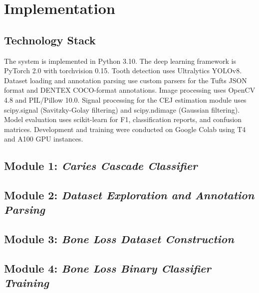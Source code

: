 
\chapter{Implementation}
\label{ch:implementation}

\section{Technology Stack}
\label{sec:impl-stack}

The system is implemented in Python 3.10. The deep learning framework is PyTorch 2.0 with torchvision 0.15. Tooth detection uses Ultralytics YOLOv8. Dataset loading and annotation parsing use custom parsers for the Tufts JSON format and DENTEX COCO-format annotations. Image processing uses OpenCV 4.8 and PIL/Pillow 10.0. Signal processing for the CEJ estimation module uses scipy.signal (Savitzky-Golay filtering) and scipy.ndimage (Gaussian filtering). Model evaluation uses scikit-learn for F1, classification reports, and confusion matrices. Development and training were conducted on Google Colab using T4 and A100 GPU instances. 


\section{Module 1: \textit{Caries Cascade Classifier }}
\label{sec:impl-module1}



\section{Module 2: \textit{Dataset Exploration and Annotation Parsing }}
\label{sec:impl-module2}


\section{Module 3: \textit{Bone Loss Dataset Construction}}
\label{sec:impl-module3}

\section{Module 4: \textit{Bone Loss Binary Classifier Training }}
\label{sec:impl-module4}

